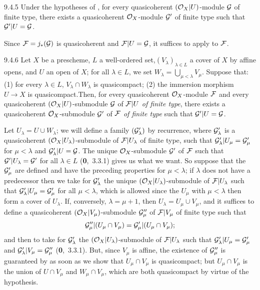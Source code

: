 \begin{env}[Corollary]{9.4.5}
Under the hypotheses of , for every quasicoherent $(\mathcal{O}_X|U)$-module
$\mathcal{G}$ of finite type, there exists a quasicoherent $\mathcal{O}_X$-module
$\mathcal{G}'$ of finite type such that $\mathcal{G}'|U=\mathcal{G}$.
\end{env}

Since $\mathcal{F}=j_\ast(\mathcal{G})$ is quasicoherent  and
$\mathcal{F}|U=\mathcal{G}$, it suffices to apply  to $\mathcal{F}$.

\begin{env}[Lemma]{9.4.6}
Let $X$ be a prescheme, $L$ a well-ordered set,$(V_\lambda)_{\lambda\in L}$ a cover
of $X$ by affine opens, and $U$ an open of
$X$; for all $\lambda\in L$, we set $W_\lambda=\bigcup_{\mu<\lambda}V_\mu$.
Suppose that: (1) for every $\lambda\in L$, $V_\lambda\cap W_\lambda$ is
quasicompact; (2) the immersion morphism $U\to X$ is quasicompact.Then, for
every quasicoherent $\mathcal{O}_X$-module $\mathcal{F}$ and every quasicoherent
$(\mathcal{O}_X|U)$-submodule $\mathcal{G}$ of $\mathcal{F}|U$ \emph{of finite type}, there
exists a quasicoherent $\mathcal{O}_X$-submodule $\mathcal{G}'$ of $\mathcal{F}$ \emph{of
finite type} such that $\mathcal{G}'|U=\mathcal{G}$.
\end{env}

Let $U_\lambda=U\cup W_\lambda$; we will define a family $(\mathcal{G}'_\lambda)$
by recurrence, where $\mathcal{G}'_\lambda$ is a quasicoherent
$(\mathcal{O}_X|U_\lambda)$-submodule of $\mathcal{F}|U_\lambda$ of finite type, such that
$\mathcal{G}'_\lambda|U_\mu=\mathcal{G}'_\mu$ for $\mu<\lambda$ and
$\mathcal{G}'_\lambda|U=\mathcal{G}$. The unique $\mathcal{O}_X$-submodule $\mathcal{G}'$ of
$\mathcal{F}$ such that $\mathcal{G}'|U_\lambda=\mathcal{G}'$ for all $\lambda\in L$
(\textbf{0},~3.3.1) gives us what we want. So suppose that the $\mathcal{G}'_\mu$
are defined and have the preceding properties for $\mu<\lambda$; if $\lambda$
does not have a predecessor then we take for $\mathcal{G}'_\lambda$ the unique
$(\mathcal{O}_X|U_\lambda)$-submodule of $\mathcal{F}|U_\lambda$ such that
$\mathcal{G}'_\lambda|U_\mu=\mathcal{G}'_\mu$ for all $\mu<\lambda$, which is
allowed since the $U_\mu$ with $\mu<\lambda$ then form a cover of $U_\lambda$.
If, conversely, $\lambda=\mu+1$, then $U_\lambda=U_\mu\cup V_\mu$, and it
suffices to define a quasicoherent $(\mathcal{O}_X|V_\mu)$-submodule $\mathcal{G}''_\mu$
of $\mathcal{F}|V_\mu$ of finite type such that
\[
  \mathcal{G}''_\mu|(U_\mu\cap V_\mu)=\mathcal{G}'_\mu|(U_\mu\cap V_\mu);
\]
and then to take for $\mathcal{G}'_\lambda$ the
$(\mathcal{O}_X|U_\lambda)$-submodule of $\mathcal{F}|U_\lambda$ such that
$\mathcal{G}'_\lambda|U_\mu=\mathcal{G}'_\mu$ and
$\mathcal{G}'_\lambda|V_\mu=\mathcal{G}''_\mu$ (\textbf{0},~3.3.1). But, since
$V_\mu$ is affine, the existence of $\mathcal{G}''_\mu$ is guaranteed by 
as soon as we show that $U_\mu\cap V_\mu$ is quasicompact; but $U_\mu\cap
V_\mu$ is the union of $U\cap V_\mu$ and $W_\mu\cap V_\mu$, which are both
quasicompact by virtue of the hypothesis.


